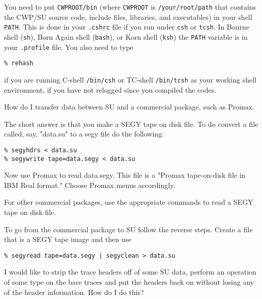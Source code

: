 {{{{{{{\begin{rmans}
You need to put {\tt CWPROOT/bin} (where {\tt CWPROOT}
is {\tt /your/root/path} that
contains the {\sf CWP/SU} source code, include files,
libraries, and executables)
in your shell {\tt PATH}. This is done in your {\tt .cshrc} file
if you run under
{\tt csh} or {\tt tcsh}.
In Bourne shell ({\tt sh}), Born Again shell ({\tt bash}), or Korn shell
({\tt ksh}) the {\tt PATH} variable is in your {\tt .profile} file.
You also need
to type
{\small\begin{verbatim}
% rehash
\end{verbatim}}\noindent
if you are running C-shell {\tt /bin/csh} or  TC-shell {\tt /bin/tcsh}
as your working shell environment, if you have not relogged since 
you compiled the codes. 
\end{rmans} 

\begin{question}
How do I transfer data between {\small\sf SU} and a commercial package, such
as Promax.
\end{question}

\begin{rmans}
The short answer is that you make a SEGY tape on disk file.
To do convert a file called, say, "data.su" to a segy file
do the following:

{\small \begin{verbatim}
% segyhdrs < data.su
% segywrite tape=data.segy < data.su
\end{verbatim}} \noindent

Now use Promax to read data.segy. This file is a
"Promax tape-on-disk file in IBM Real format."
Choose Promax menus accordingly.

\noindent For other commercial packages, use the appropriate
commands to read a SEGY tape on disk file.

\noindent To go from the commercial package to {\small\sf SU} follow
the reverse steps. Create a file that is a SEGY tape image
and then use 
{\small \begin{verbatim}
% segyread tape=data.segy | segyclean > data.su
\end{verbatim}} \noindent
\end{rmans}
 
\begin{question}
I would like to strip the trace headers off of some SU data, perform
an operation of some type on the bare traces and put the headers
back on without losing any of the header information. How do I do this?
\end{question}

}}}}}}}
